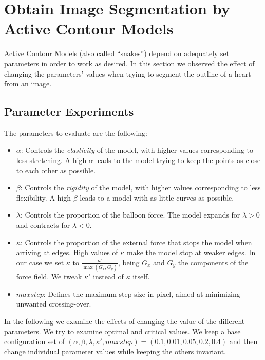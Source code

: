 \section{Obtain Image Segmentation by Active Contour Models}

Active Contour Models (also called ``snakes'') depend on adequately set parameters in order to work as desired. In this section we observed the effect of changing the parameters' values when trying to segment the outline of a heart from an image.

\subsection{Parameter Experiments}

The parameters to evaluate are the following:

\begin{itemize}

	\item $\alpha$: Controls the \textit{elasticity} of the model, with higher values corresponding to less stretching. A high $\alpha$ leads to the model trying to keep the points as close to each other as possible.
	
	\item $\beta$: Controls the \textit{rigidity} of the model, with higher values corresponding to less flexibility. A high $\beta$ leads to a model with as little curves as possible.
	
	\item $\lambda$: Controls the proportion of the balloon force. The model expands for $\lambda > 0$ and contracts for $\lambda < 0$.
	
	\item $\kappa$: Controls the proportion of the external force that stops the model when arriving at edges. High values of $\kappa$ make the model stop at weaker edges. In our case we set $ \kappa $ to $ \frac{\kappa'}{\max (G_x, G_y)} $, being $ G_x $ and $ G_y $ the components of the force field. We tweak $ \kappa' $ instead of $ \kappa $ itself.
	
	\item $maxstep$: Defines the maximum step size in pixel, aimed at minimizing unwanted crossing-over.
	
\end{itemize}

In the following we examine the effects of changing the value of the different parameters. We try to examine optimal and critical values. We keep a base configuration set of $(\alpha , \beta , \lambda , \kappa' , maxstep) = (0.1 , 0.01 , 0.05 , 0.2 , 0.4)$ and then change individual parameter values while keeping the others invariant.

